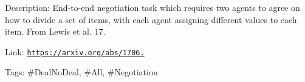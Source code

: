 Description\+: End-\/to-\/end negotiation task which requires two agents to agree on how to divide a set of items, with each agent assigning different values to each item. From Lewis et al. \textquotesingle{}17.

Link\+: \href{https://arxiv.org/abs/1706.05125}{\tt https\+://arxiv.\+org/abs/1706.}

Tags\+: \#\+Deal\+No\+Deal, \#\+All, \#\+Negotiation 